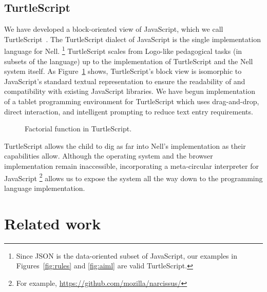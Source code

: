 \documentclass[preprint]{sig-alternate}
\begin{document}

\subsection{TurtleScript}\label{sec:turtles}

We have developed a block-oriented view of JavaScript, which we call
TurtleScript~\cite{turtlescript}.
The TurtleScript dialect of JavaScript is the single
implementation language for Nell.%
\footnote{Since JSON is the data-oriented subset of JavaScript,
our examples in Figures~\ref{fig:rules} and \ref{fig:aiml} are valid
TurtleScript.} %
TurtleScript scales from Logo-like
pedagogical tasks (in subsets of the language) up to the
implementation of TurtleScript and the
Nell system itself.  As Figure~\ref{fig:turtlescript} shows,
TurtleScript's block view is isomorphic to
JavaScript's standard textual
representation to
ensure the readability of and compatibility with existing JavaScript libraries.
%
We have begun implementation of a
tablet programming environment for TurtleScript which uses
drag-and-drop, direct interaction, and intelligent prompting to reduce
text entry requirements.

\begin{figure}
\centering
{}
\caption{Factorial function in TurtleScript.}\label{fig:turtlescript}
\end{figure}

TurtleScript allows the child to dig as far into Nell's implementation
as their capabilities allow.  Although the operating system and the
browser implementation remain inaccessible, incorporating a
meta-circular interpreter for JavaScript%
\footnote{For example, \url{https://github.com/mozilla/narcissus/}}
allows us to expose the system all the way down to the programming
language implementation.


\section{Related work}\label{sec:related}
\end{document}
